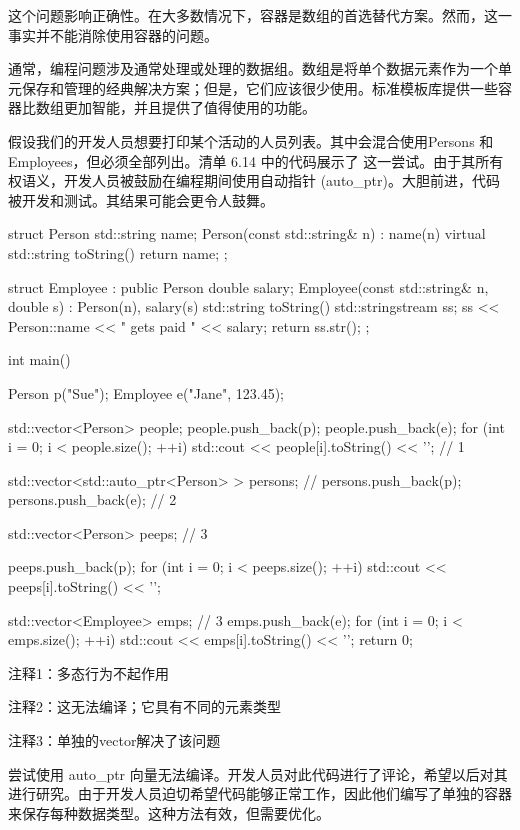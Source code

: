 这个问题影响正确性。在大多数情况下，容器是数组的首选替代方案。然而，这一事实并不能消除使用容器的问题。


通常，编程问题涉及通常处理或处理的数据组。数组是将单个数据元素作为一个单元保存和管理的经典解决方案；但是，它们应该很少使用。标准模板库提供一些容器比数组更加智能，并且提供了值得使用的功能。

假设我们的开发人员想要打印某个活动的人员列表。其中会混合使用Persons 和 Employees，但必须全部列出。清单 6.14 中的代码展示了 这一尝试。由于其所有权语义，开发人员被鼓励在编程期间使用自动指针 (auto\_ptr)。大胆前进，代码被开发和测试。其结果可能会更令人鼓舞。


\begin{cpp}
struct Person {
  std::string name;
  Person(const std::string& n) : name(n) {}
  virtual std::string toString() { return name; }
};

struct Employee : public Person {
  double salary;
  Employee(const std::string& n, double s) : Person(n), salary(s) {}
  std::string toString() {
    std::stringstream ss;
    ss << Person::name << " gets paid " << salary;
    return ss.str();
  }
};

int main() {
  Person p("Sue");
  Employee e("Jane", 123.45);

  std::vector<Person> people;
  people.push_back(p);
  people.push_back(e);
  for (int i = 0; i < people.size(); ++i)
    std::cout << people[i].toString() << '\n'; // 1

  std::vector<std::auto_ptr<Person> > persons;
  // persons.push_back(p); persons.push_back(e); // 2

  std::vector<Person> peeps; // 3

  peeps.push_back(p);
  for (int i = 0; i < peeps.size(); ++i)
    std::cout << peeps[i].toString() << '\n';

  std::vector<Employee> emps; // 3
  emps.push_back(e);
  for (int i = 0; i < emps.size(); ++i)
    std::cout << emps[i].toString() << '\n';
  return 0;
}
\end{cpp}

{\footnotesize
注释1：多态行为不起作用

注释2：这无法编译；它具有不同的元素类型

注释3：单独的vector解决了该问题
}


尝试使用 auto\_ptr 向量无法编译。开发人员对此代码进行了评论，希望以后对其进行研究。由于开发人员迫切希望代码能够正常工作，因此他们编写了单独的容器来保存每种数据类型。这种方法有效，但需要优化。

